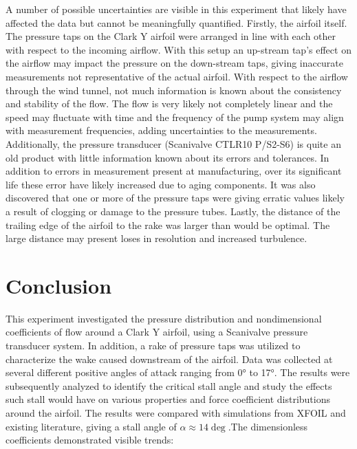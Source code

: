 \documentclass[11pt, letterpaper]{article}
\begin{document}
A number of possible uncertainties are visible in this experiment that likely have affected the data but cannot be meaningfully quantified. Firstly, the airfoil itself. The pressure taps on the Clark Y airfoil were arranged in line with each other with respect to the incoming airflow. With this setup an up-stream tap's effect on the airflow may impact the pressure on the down-stream taps, giving inaccurate measurements not representative of the actual airfoil. With respect to the airflow through the wind tunnel, not much information is known about the consistency and stability of the flow. The flow is very likely not completely linear and the speed may fluctuate with time and the frequency of the pump system may align with measurement frequencies, adding uncertainties to the measurements. Additionally, the pressure transducer (Scanivalve CTLR10 P/S2-S6) is quite an old product with little information known about its errors and tolerances. In addition to errors in measurement present at manufacturing, over its significant life these error have likely increased due to aging components. It was also discovered that one or more of the pressure taps were giving erratic values likely a result of clogging or damage to the pressure tubes. Lastly, the distance of the trailing edge of the airfoil to the rake was larger than would be optimal. The large distance may present loses in resolution and increased turbulence.

\section{Conclusion}

This experiment investigated the pressure distribution and nondimensional coefficients of flow around a Clark Y airfoil, using a Scanivalve pressure transducer system. In addition, a rake of pressure taps was utilized to characterize the wake caused downstream of the airfoil. Data was collected at several different positive angles of attack ranging from 0° to 17°. The results were subsequently analyzed to identify the critical stall angle and study the effects such stall would have on various properties and force coefficient distributions around the airfoil. The results were compared with simulations from XFOIL and existing literature, giving a stall angle of $\alpha \approx 14 \deg$.The dimensionless coefficients demonstrated visible trends: 
\end{document}

